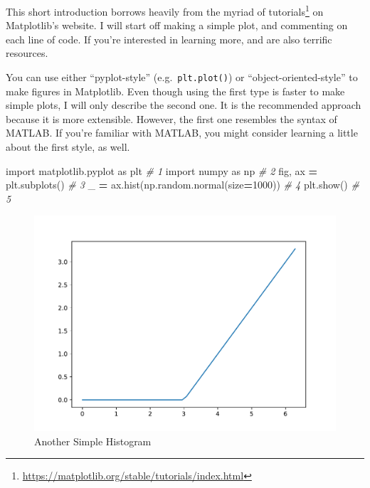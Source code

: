 \documentclass[
  12pt,
  krantz2]{krantz}
\makeatletter
\newenvironment{Shaded}{\begin{snugshade}}{\end{snugshade}}
\newcommand{\CommentTok}[1]{\textcolor[rgb]{0.37,0.37,0.37}{\textit{#1}}}
\newcommand{\DecValTok}[1]{\textcolor[rgb]{0.06,0.06,0.06}{#1}}
\newcommand{\ImportTok}[1]{#1}
\newcommand{\NormalTok}[1]{#1}
\newcommand{\OperatorTok}[1]{\textcolor[rgb]{0.43,0.43,0.43}{\textbf{#1}}}
\renewcommand{\href}[2]{#2\footnote{\url{#1}}}
\newenvironment{kframe}{%
\medskip{}
\setlength{\fboxsep}{.8em}
 \def\at@end@of@kframe{}%
 \ifinner\ifhmode%
  \def\at@end@of@kframe{\end{minipage}}%
  \begin{minipage}{\columnwidth}%
 \fi\fi%
 \def\FrameCommand##1{\hskip\@totalleftmargin \hskip-\fboxsep
 \colorbox{shadecolor}{##1}\hskip-\fboxsep
     \hskip-\linewidth \hskip-\@totalleftmargin \hskip\columnwidth}%
 \MakeFramed {\advance\hsize-\width
   \@totalleftmargin\z@ \linewidth\hsize
   \@setminipage}}%
 {\par\unskip\endMakeFramed%
 \at@end@of@kframe}
\renewenvironment{Shaded}{\begin{kframe}}{\end{kframe}}
\makeatother
\begin{document}
This short introduction borrows heavily from the myriad of \href{https://matplotlib.org/stable/tutorials/index.html}{tutorials} on Matplotlib's website. I will start off making a simple plot, and commenting on each line of code. If you're interested in learning more, \citep{py_ds_handbook} and \citep{pandas_guy} are also terrific resources.

\begin{rmd-details}
You can use either ``pyplot-style'' (e.g.~\texttt{plt.plot()}) or ``object-oriented-style'' to make figures in Matplotlib. Even though using the first type is faster to make simple plots, I will only describe the second one. It is the recommended approach because it is more extensible. However, the first one resembles the syntax of MATLAB. If you're familiar with MATLAB, you might consider learning a little about the first style, as well.

\end{rmd-details}

\begin{Shaded}
\begin{Highlighting}[]
\ImportTok{import}\NormalTok{ matplotlib.pyplot }\ImportTok{as}\NormalTok{ plt       }\CommentTok{\# 1}
\ImportTok{import}\NormalTok{ numpy }\ImportTok{as}\NormalTok{ np                    }\CommentTok{\# 2}
\NormalTok{fig, ax }\OperatorTok{=}\NormalTok{ plt.subplots()              }\CommentTok{\# 3}
\NormalTok{\_ }\OperatorTok{=}\NormalTok{ ax.hist(np.random.normal(size}\OperatorTok{=}\DecValTok{1000}\NormalTok{))  }\CommentTok{\# 4}
\NormalTok{plt.show()                            }\CommentTok{\# 5}
\end{Highlighting}
\end{Shaded}

\begin{figure}

{\centering \includegraphics[width=0.8\linewidth]{r_and_python_book_files/figure-latex/unnamed-chunk-227-1} 

}

\caption{Another Simple Histogram}\label{fig:unnamed-chunk-227}
\end{figure}
\end{document}

